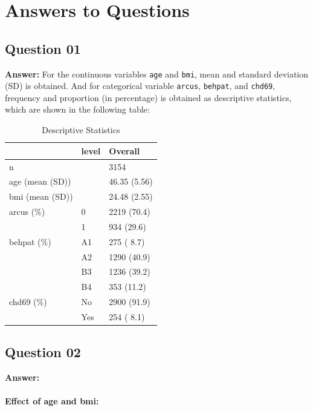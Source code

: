 \documentclass[
  12pt,
  oneside]{article}
\begin{document}
\hypertarget{answers-to-questions}{%
\section{Answers to Questions}\label{answers-to-questions}}

\hypertarget{question-01}{%
\subsection{Question 01}\label{question-01}}

\textbf{Answer:} For the continuous variables \texttt{age} and \texttt{bmi}, mean and standard deviation (SD) is obtained. And for categorical variable \texttt{arcus}, \texttt{behpat}, and \texttt{chd69}, frequency and proportion (in percentage) is obtained as descriptive statistics, which are shown in the following table:

\begin{table}[H]

\caption{\label{tab:Table-01}Descriptive Statistics}
\centering
\begin{tabular}[t]{lll}
\toprule
  & level & Overall\\
\midrule
n &  & 3154\\
age (mean (SD)) &  & 46.35 (5.56)\\
bmi (mean (SD)) &  & 24.48 (2.55)\\
arcus (\%) & 0 & 2219 (70.4)\\
 & 1 & 934 (29.6)\\
\addlinespace
behpat (\%) & A1 & 275 ( 8.7)\\
 & A2 & 1290 (40.9)\\
 & B3 & 1236 (39.2)\\
 & B4 & 353 (11.2)\\
chd69 (\%) & No & 2900 (91.9)\\
\addlinespace
 & Yes & 254 ( 8.1)\\
\bottomrule
\end{tabular}
\end{table}

\clearpage

\hypertarget{question-02}{%
\subsection{Question 02}\label{question-02}}

\textbf{Answer:}

\hypertarget{effect-of-age-and-bmi}{%
\paragraph{Effect of age and bmi:}\label{effect-of-age-and-bmi}}
\end{document}
